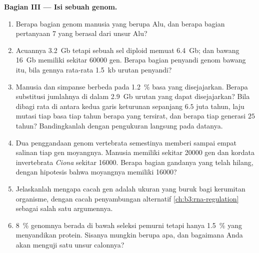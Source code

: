 \begin{problem}
\medskip
\noindent\textbf{Bagian III --- Isi sebuah genom.}
\begin{enumerate}[resume]
  \item Berapa bagian genom manusia yang berupa Alu, dan berapa bagian
         pertanyaan 7 yang berasal dari unsur Alu?
  \item Acuannya \qty{3.2}{Gb} tetapi sebuah sel diploid memuat
        \qty{6.4}{Gb}; dan bawang \qty{16}{Gb} memiliki sekitar \num{60000}
        gen. Berapa bagian penyandi genom bawang itu, bila gennya rata-rata
        \qty{1.5}{kb} urutan penyandi?
  \item Manusia dan simpanse berbeda pada \qty{1.2}{\%} basa yang
        disejajarkan. Berapa substitusi jumlahnya di dalam \qty{2.9}{Gb}
        urutan yang dapat disejajarkan? Bila dibagi rata di antara kedua
        garis keturunan sepanjang $6.5$ juta tahun, laju mutasi tiap basa
        tiap tahun berapa yang tersirat, dan berapa tiap generasi $25$
        tahun? Bandingkanlah dengan pengukuran langsung pada datanya.
  \item Dua penggandaan genom vertebrata semestinya memberi sampai empat
        salinan tiap gen moyangnya. Manusia memiliki sekitar \num{20000}
        gen dan kordata invertebrata \emph{Ciona} sekitar
        \num{16000}. Berapa bagian gandanya yang telah hilang, dengan
        hipotesis bahwa moyangnya memiliki \num{16000}?
  \item Jelaskanlah mengapa cacah gen adalah ukuran yang buruk bagi
        kerumitan organisme, dengan cacah penyambungan alternatif
        \cref{ch:b3:rna-regulation} sebagai salah satu argumennya.
  \item \qty{8}{\%} genomnya berada di bawah seleksi pemurni tetapi hanya
        \qty{1.5}{\%} yang menyandikan protein. Sisanya mungkin berupa apa,
        dan bagaimana Anda akan menguji satu unsur calonnya?
\end{enumerate}


\end{problem}
